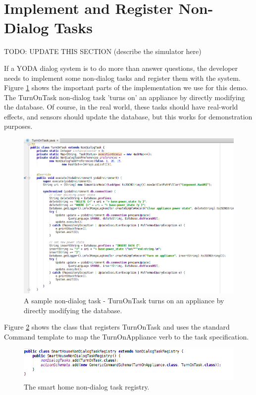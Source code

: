 \documentclass[titlepage]{article}
\begin{document}
\section{Implement and Register Non-Dialog Tasks}

TODO: UPDATE THIS SECTION (describe the simulator here)

If a YODA dialog system is to do more than answer questions, the developer needs to implement some non-dialog tasks and register them with the system.
Figure \ref{fig:turn_on_task} shows the important parts of the implementation we use for this demo.
The TurnOnTask non-dialog task 'turns on' an appliance by directly modifying the database.
Of course, in the real world, these tasks should have real-world effects, and sensors should update the database, but this works for demonstration purposes.


\begin{figure}[htbp!]
\centering
\includegraphics[width=\textwidth]{TurnOnTask}
\caption{A sample non-dialog task - TurnOnTask turns on an appliance by directly modifying the database.}
\label{fig:turn_on_task}
\end{figure}

Figure \ref{fig:non_dialog_task_registry} shows the class that registers TurnOnTask and uses the standard Command template to map the TurnOnAppliance verb to the task specification.


\begin{figure}[htbp!]
\centering
\includegraphics[width=\textwidth]{NonDialogTaskRegistry}
\caption{The smart home non-dialog task registry.}
\label{fig:non_dialog_task_registry}
\end{figure}
\end{document}
